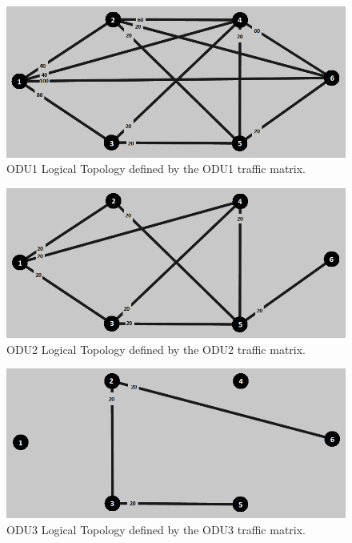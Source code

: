 \begin{figure}[H]
\centering
\includegraphics[width=13cm]{sdf/heuristic/opaque_survivability/high/logical_topology_odu1_high}
\caption{ODU1 Logical Topology defined by the ODU1 traffic matrix.}
\label{logical_ODU1_surv_ref_high_heuristic}
\end{figure}

\begin{figure}[H]
\centering
\includegraphics[width=13cm]{sdf/heuristic/opaque_survivability/high/logical_topology_odu2_high}
\caption{ODU2 Logical Topology defined by the ODU2 traffic matrix.}
\label{logical_ODU2_surv_ref_high_heuristic}
\end{figure}

\begin{figure}[H]
\centering
\includegraphics[width=13cm]{sdf/heuristic/opaque_survivability/high/logical_topology_odu3_high}
\caption{ODU3 Logical Topology defined by the ODU3 traffic matrix.}
\label{logical_ODU3_surv_ref_high_heuristic}
\end{figure}

